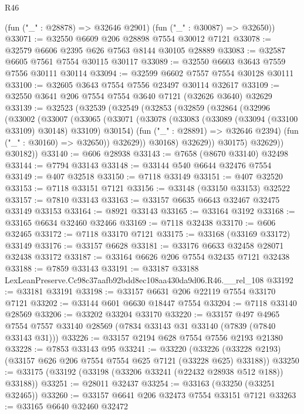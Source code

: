 \begin{lexlean}{R46}
\begin{coremodule}
      (fun ("_" : @28878) => @32646 @2901)
      (fun ("_" : @30087) => @32650))
@33071 := @32550 @6609 @206 @28898 @7554 @30012 @7121
@33078 := @32579 @6606 @2395 @626 @7563 @8144 @30105 @28889
@33083 := @32587 @6605 @7561 @7554 @30115 @30117
@33089 := @32550 @6603 @3643 @7559 @7556 @30111 @30114
@33094 := @32599 @6602 @7557 @7554 @30128 @30111
@33100 := @32605 @3643 @7554 @7556 @23497 @30114 @32617
@33109 := @32550 @3641 @206 @7554 @7554 @3640 @7121 (@32626 @3640) @32629
@33139 := @32523
    (@32539
      (@32549
        (@32853
          (@32859
            (@32864
              (@32996
                (@33002
                  (@33007
                    (@33065
                      (@33071
                        (@33078
                          (@33083 (@33089 (@33094 (@33100 @33109) @30148) @33109) @30154)
                          (fun ("_" : @28891) => @32646 @2394)
                          (fun ("_" : @30160) => @32650))
                        @32629))
                    @30168)
                  @32629))
              @30175)
            @32629))
        @30182))
@33140 := @606 @28938
@33143 := @7658 (@8670 @33140) @32498
@33144 := @7794 @33143
@33148 := @33144 @540 @6644 @32476 @7554
@33149 := @407 @32518
@33150 := @7118 @33149
@33151 := @407 @32520
@33153 := @7118 @33151 @7121
@33156 := @33148 (@33150 @33153) @32522
@33157 := @7810 @33143
@33163 := @33157 @6635 @6643 @32467 @32475 @33149 @33153
@33164 := @8921 @33143
@33165 := @33164 @3192
@33168 := @33165 @6634 @32460 @32466
@33169 := @7118 @32438
@33170 := @606 @32465
@33172 := @7118 @33170 @7121
@33175 := @33168 (@33169 @33172) @33149
@33176 := @33157 @6628
@33181 := @33176 @6633 @32458 @28071 @32438 @33172
@33187 := @33164 @6626 @206 @7554 @32435 @7121 @32438
@33188 := @7859 @33143
@33191 := @33187 @33188 LexLeanPreserve.Cc98c37aafb92bdd8ec108aa430da9d06.R46.__rel_108
@33192 := @33181 @33191
@33198 := @33157 @6631 @206 @22119 @7554 @33170 @7121
@33202 := @33144 @601 @6630 @18447 @7554
@33204 := @7118 @33140 @28569
@33206 := @33202 @33204 @33170
@33220 := @33157
    @497
    @4965
    @7554
    @7557
    @33140
    @28569
    (@7834 @33143 @31 @33140 (@7839 (@7840 @33143 @31)))
@33226 := @33157 @2194 @628 @7554 @7556 @2193 @21380
@33228 := @7853 @33143 @95
@33241 := @33220
    (@33226 (@33228 @2193) (@33157 @626 @206 @7554 @7554 @625 @7121 (@33228 @625) @33188))
@33250 := @33175 (@33192 (@33198 (@33206 @33241 (@22432 @28938 @512 @188)) @33188))
@33251 := @28011 @32437
@33254 := @33163 (@33250 (@33251 @32465))
@33260 := @33157 @6641 @206 @32473 @7554 @33151 @7121
@33263 := @33165 @6640 @32460 @32472

\end{coremodule}
\end{lexlean}
